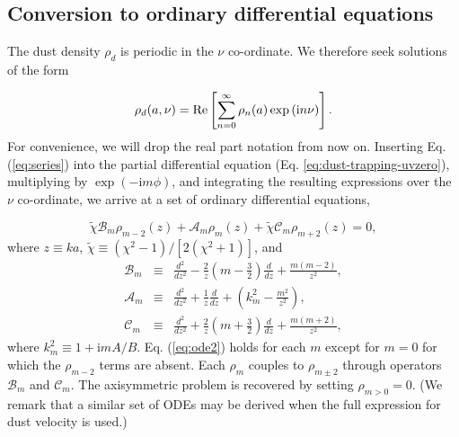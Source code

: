 \documentclass[apj]{emulateapj}
\def\brown#1{\textcolor{brown}{#1}}
\newcommand{\comm}[1]{({\it \brown{#1}})}
\newcommand{\Eq}[1]{Eq. (\ref{#1})}
\newcommand{\eq}[1]{\Eq{#1}}
\newcommand{\eqp}[1]{(Eq. \ref{#1})}
\newcommand{\beq}{\begin{equation}}
\newcommand{\eeq}{\end{equation}}
\newcommand{\beqn}{\begin{eqnarray}}
\newcommand{\eeqn}{\end{eqnarray}}
\begin{document}
\subsection{Conversion to ordinary differential equations}
The dust density $\rho_d$ is periodic in the $\nu$ co-ordinate. We
therefore seek solutions of the form

\beq\label{eq:series}
\rho_d(a,\nu) = {\rm Re}
\left[\sum_{n=0}^\infty\rho_n(a)\exp{\left(\mathrm{i}n\nu\right)} \right].
\eeq
For convenience, we will drop the real part notation from now on. Inserting
\eq{eq:series} into the partial differential equation \eqp{eq:dust-trapping-uvzero},
multiplying by $\exp{(-\mathrm{i}m\phi)}$, and integrating the resulting
expressions over the $\nu$ co-ordinate, we arrive at a set of 
ordinary differential equations, 

\beq\label{eq:ode2}
\tilde{\chi}\mathcal{B}_m\rho_{m-2}(z) + \mathcal{A}_m\rho_m(z) + \tilde{\chi}\mathcal{C}_m\rho_{m+2}(z)=0,
\eeq
where $z\equiv ka$, $\tilde{\chi}\equiv(\chi^2-1)/[2(\chi^2+1)]$, and 
\beqn\label{eq:ops}
\mathcal{B}_m &\equiv& \frac{d^2}{dz^2} -
\frac{2}{z}\left(m-\frac{3}{2}\right)\frac{d}{dz} + \frac{m(m-2)}{z^2},\\
\mathcal{A}_m &\equiv& \frac{d^2}{dz^2} + \frac{1}{z}\frac{d}{dz} +
\left(k_m^2 - \frac{m^2}{z^2}\right),\\
\mathcal{C}_m  &\equiv& \frac{d^2}{dz^2} +
\frac{2}{z}\left(m+\frac{3}{2}\right)\frac{d}{dz} +
\frac{m(m+2)}{z^2}, 
\eeqn
where $k_m^2 \equiv 1+\mathrm{i}mA/B$. \eq{eq:ode2} holds for each
$m$ except for $m=0$ for which the $\rho_{m-2}$ terms are absent. Each
$\rho_m$ couples to $\rho_{m\pm2}$ through operators $\mathcal{B}_m$
and $\mathcal{C}_m$. The axisymmetric problem is recovered by
setting $\rho_{m>0}=0$. (We remark that a similar set of ODEs may be
derived when the full expression for dust velocity is used.)  
\end{document}

